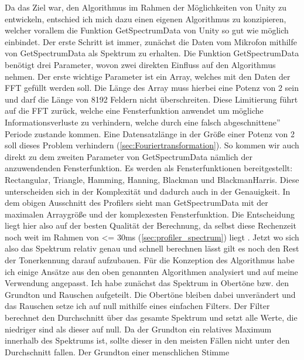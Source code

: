 Da das Ziel war, den Algorithmus im Rahmen der Möglichkeiten von Unity zu entwickeln, entschied ich mich dazu einen eigenen Algorithmus zu konzipieren, welcher vorallem die Funktion GetSpectrumData von Unity so gut wie möglich einbindet. Der erste Schritt ist immer, zunächst die Daten vom Mikrofon mithilfe von GetSpectrumData als Spektrum zu erhalten. Die Funktion GetSpectrumData benötigt drei Parameter, wovon zwei direkten Einfluss auf den Algorithmus nehmen. Der erste wichtige Parameter ist ein Array, welches mit den Daten der FFT gefüllt werden soll. Die Länge des Array muss hierbei eine Potenz von 2 sein und darf die Länge von 8192 Feldern nicht überschreiten. Diese Limitierung führt auf die FFT zurück, welche eine Fensterfunktion anwendet um mögliche Informationsverluste zu verhindern, welche durch eine falsch \glqq abgeschnittene'' Periode zustande kommen. Eine Datensatzlänge in der Größe einer Potenz von 2 soll dieses Problem verhindern (\ref{sec:Fouriertransformation}).  So kommen wir auch direkt zu dem zweiten Parameter von GetSpectrumData nämlich der anzuwendenden Fensterfunktion. Es werden als Fensterfunktionen bereitgestellt: Rectangular, Triangle, Hamming, Hanning, Blackman und BlackmanHarris. Diese unterscheiden sich in der Komplexität und dadurch auch in der Genauigkeit. In dem obigen Ausschnitt des Profilers sieht man GetSpectrumData mit der maximalen Arraygröße und der komplexesten Fensterfunktion. Die Entscheidung liegt hier also auf der besten Qualität der Berechnung, da selbst diese Rechenzeit noch weit im Rahmen von <= 30ms (\ref{sec:profiler_spectrum}) liegt \cite{lago2004quest}. Jetzt wo sich also das Spektrum relativ genau und schnell berechnen lässt gilt es noch den Rest der Tonerkennung darauf aufzubauen. Für die Konzeption des Algorithmus habe ich einige Ansätze aus den oben genannten Algorithmen analysiert und auf meine Verwendung angepasst. Ich habe zunächst das Spektrum in Obertöne bzw. den Grundton und Rauschen aufgeteilt. Die Obertöne bleiben dabei unverändert und das Rauschen setze ich auf null mithilfe eines einfachen Filters. Der Filter berechnet den Durchschnitt über das gesamte Spektrum und setzt alle Werte, die niedriger sind als dieser auf null. Da der Grundton ein relatives Maximum innerhalb des Spektrums ist, sollte dieser in den meisten Fällen nicht unter den Durchschnitt fallen. Der Grundton einer menschlichen Stimme 

